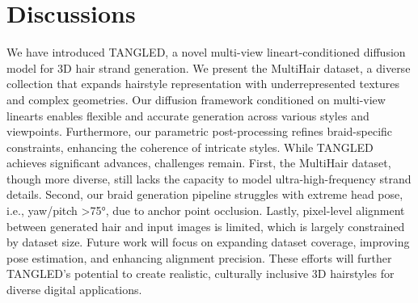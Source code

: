 \section{Discussions}
\label{sec:conclusions}


We have introduced TANGLED, a novel multi-view lineart-conditioned diffusion model for 3D hair strand generation. We present the MultiHair dataset, a diverse collection that expands hairstyle representation with underrepresented textures and complex geometries. Our diffusion framework conditioned on multi-view linearts enables flexible and accurate generation across various styles and viewpoints. Furthermore, our parametric post-processing refines braid-specific constraints, enhancing the coherence of intricate styles.
%
While TANGLED achieves significant advances, challenges remain. First, the MultiHair dataset, though more diverse, still lacks the capacity to model ultra-high-frequency strand details. Second, our braid generation pipeline struggles with extreme head pose, i.e., yaw/pitch \textgreater 75°, due to anchor point occlusion. Lastly, pixel-level alignment between generated hair and input images is limited, which is largely constrained by dataset size. Future work will focus on expanding dataset coverage, improving pose estimation, and enhancing alignment precision. These efforts will further TANGLED’s potential to create realistic, culturally inclusive 3D hairstyles for diverse digital applications.


